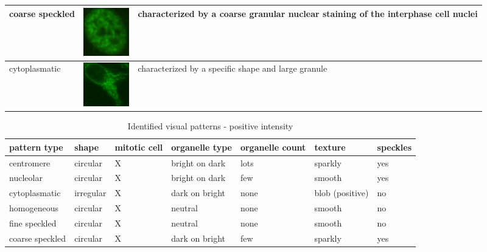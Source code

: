 \begin{table}
\begin{center}
\begin{tabular}{|m{2.3cm}|m{2.1cm}|m{8cm}|}
		coarse speckled & \vspace{5pt} \includegraphics[width=2cm]{Figures/describing/coarse_speckled} & characterized by a coarse granular nuclear staining of the interphase cell nuclei \\ \hline
		
		cytoplasmatic & \vspace{5pt} \includegraphics[width=2cm]{Figures/describing/cytoplasmatic} & characterized by a specific shape and large granule \\ \hline
	\end{tabular}
	\end{center}
\end{table}

\begin{table}
	\caption{Identified visual patterns - positive intensity}
	\label{tab:Vpata}
	\small
	\begin{tabular}{|m{2.2cm}|m{1.4cm}|m{1.5cm}|m{1.5cm}|m{1.4cm}|m{1.6cm}|m{1.4cm}|}
		\hline
		\textbf{pattern type} & \textbf{shape} & \textbf{mitotic cell} & \textbf{organelle type} & \textbf{organelle count} & \textbf{texture} & \textbf{speckles} \\ \hline
		centromere & circular & X & bright on dark & lots & sparkly  & yes \\ \hline
		nucleolar & circular & X & bright on dark & few & smooth & yes \\ \hline
		cytoplasmatic & irregular & X & dark on bright & none & blob (positive)  & no \\ \hline
		homogeneous & circular & X & neutral & none & smooth & no \\ \hline
		fine speckled & circular & X & neutral & none & smooth & no \\ \hline
		coarse speckled & circular & X & dark on bright & few & sparkly & yes \\ \hline
	\end{tabular}
	\normalsize
\end{table}

